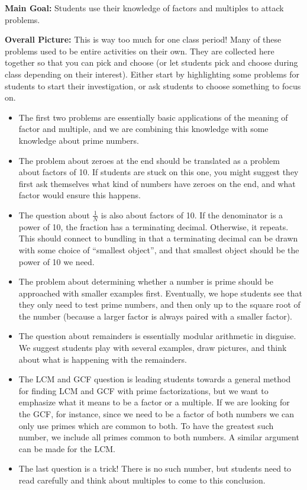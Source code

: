 \documentclass{ximera}
\begin{document}
\newpage
\begin{instructorNotes}

{\bf Main Goal:} Students use their knowledge of factors and multiples to attack problems.


{\bf Overall Picture:} This is way too much for one class period! Many of these problems used to be entire activities on their own. They are collected here together so that you can pick and choose (or let students pick and choose during class depending on their interest). Either start by highlighting some problems for students to start their investigation, or ask students to choose something to focus on.

\begin{itemize}
\item The first two problems are essentially basic applications of the meaning of factor and multiple, and we are combining this knowledge with some knowledge about prime numbers.
\item The problem about zeroes at the end should be translated as a problem about factors of 10. If students are stuck on this one, you might suggest they first ask themselves what kind of numbers have zeroes on the end, and what factor would ensure this happens.
\item The question about $\frac{1}{N}$ is also about factors of 10. If the denominator is a power of 10, the fraction has a terminating decimal. Otherwise, it repeats. This should connect to bundling in that a terminating decimal can be drawn with some choice of ``smallest object'', and that smallest object should be the power of 10 we need.
\item The problem about determining whether a number is prime should be approached with smaller examples first. Eventually, we hope students see that they only need to test prime numbers, and then only up to the square root of the number (because a larger factor is always paired with a smaller factor).
\item The question about remainders is essentially modular arithmetic in disguise. We suggest students play with several examples, draw pictures, and think about what is happening with the remainders.
\item The LCM and GCF question is leading students towards a general method for finding LCM and GCF with prime factorizations, but we want to emphasize what it means to be a factor or a multiple. If we are looking for the GCF, for instance, since we need to be a factor of both numbers we can only use primes which are common to both. To have the greatest such number, we include all primes common to both numbers. A similar argument can be made for the LCM.
\item The last question is a trick! There is no such number, but students need to read carefully and think about multiples to come to this conclusion.
\end{itemize}





\end{instructorNotes}
\end{document}
